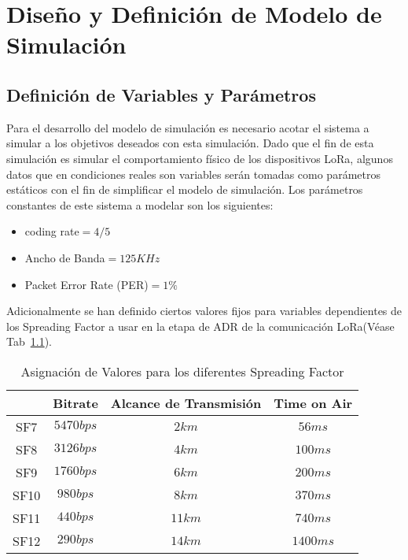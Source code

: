 \chapter{Diseño y Definición de Modelo de Simulación}
\section{Definición de Variables y Parámetros}
Para el desarrollo del modelo de simulación es necesario acotar el sistema a simular a los objetivos deseados con esta simulación. Dado que el fin de esta simulación es simular el comportamiento físico de los dispositivos LoRa, algunos datos que en condiciones reales son variables serán tomadas como parámetros estáticos con el fin de simplificar el modelo de simulación. Los parámetros constantes de este sistema a modelar son los siguientes:
\begin{itemize}
\item coding rate$=4/5$
\item Ancho de Banda$=125KHz$
\item Packet Error Rate (PER)$=1\%$
\end{itemize}
Adicionalmente se han definido ciertos valores fijos para variables dependientes de los Spreading Factor a usar en la etapa de ADR de la comunicación LoRa(Véase Tab~\ref{par:1}).~\cite{orange}\\
\begin{table}[!ht]
\begin{tabular}{|c|c|c|c|}}
Spreading Factor & Bitrate & Alcance de Transmisión & Time on Air\\\hline
SF7 & $5470bps$ & $2km$ & $56ms$ \\\hline
SF8 & $3126bps$ & $4km$ & $100ms$ \\\hline
SF9 & $1760bps$ & $6km$ & $200ms$ \\\hline
SF10 & $980bps$ & $8km$ & $370ms$ \\\hline
SF11 & $440bps$ & $11km$ & $740ms$ \\\hline
SF12 & $290bps$ & $14km$ & $1400ms$ \\\hline
\end{tabular}
\label{par:1}
\caption{Asignación de Valores para los diferentes Spreading Factor}
\end{table}